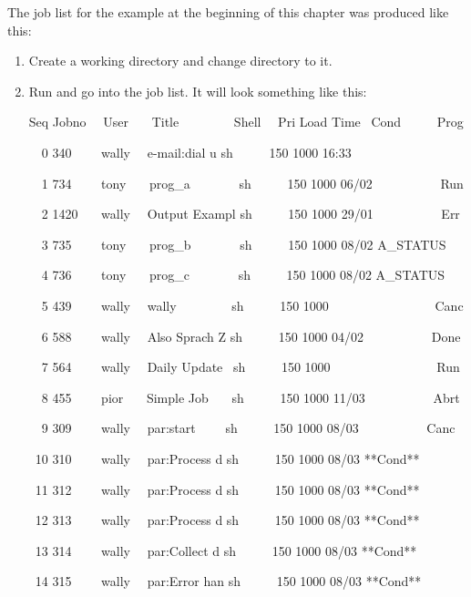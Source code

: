 The job list for the example at the beginning of this chapter was
produced like this:

\begin{enumerate}
\item Create a working directory and change directory to it.
\item Run \PrBtq{} and go into the job list. It will
look something like this:

\begin{exparasmall}

Seq Jobno \ \ User \ \ \ Title \ \ \ \ \ \ \ \ Shell \ \ Pri Load Time
\ Cond \ \ \ \ \ Prog

\ \ 0 340 \ \ \ \ wally \ \ e-mail:dial u sh \ \ \ \ \ 150 1000 16:33

\ \ 1 734 \ \ \ \ tony \ \ \ prog\_a \ \ \ \ \ \ \ sh \ \ \ \ \ 150 1000
06/02 \ \ \ \ \ \ \ \ \ \ Run

\ \ 2 1420 \ \ \ wally \ \ Output Exampl sh \ \ \ \ \ 150 1000 29/01
\ \ \ \ \ \ \ \ \ \ Err

\ \ 3 735 \ \ \ \ tony \ \ \ prog\_b \ \ \ \ \ \ \ sh \ \ \ \ \ 150 1000
08/02 A\_STATUS

\ \ 4 736 \ \ \ \ tony \ \ \ prog\_c \ \ \ \ \ \ \ sh \ \ \ \ \ 150 1000
08/02 A\_STATUS

\ \ 5 439 \ \ \ \ wally \ \ wally \ \ \ \ \ \ \ \ sh \ \ \ \ \ 150 1000
\ \ \ \ \ \ \ \ \ \ \ \ \ \ \ \ Canc

\ \ 6 588 \ \ \ \ wally \ \ Also Sprach Z sh \ \ \ \ \ 150 1000 04/02
\ \ \ \ \ \ \ \ \ \ Done

\ \ 7 564 \ \ \ \ wally \ \ Daily Update \ sh \ \ \ \ \ 150 1000
\ \ \ \ \ \ \ \ \ \ \ \ \ \ \ \ Run

\ \ 8 455 \ \ \ \ pior \ \ \ Simple Job \ \ \ sh \ \ \ \ \ 150 1000
11/03 \ \ \ \ \ \ \ \ \ \ Abrt

\ \ 9 309 \ \ \ \ wally \ \ par:start \ \ \ \ sh \ \ \ \ \ 150 1000
08/03 \ \ \ \ \ \ \ \ \ \ Canc

\ 10 310 \ \ \ \ wally \ \ par:Process d sh \ \ \ \ \ 150 1000 08/03
**Cond**

\ 11 312 \ \ \ \ wally \ \ par:Process d sh \ \ \ \ \ 150 1000 08/03
**Cond**

\ 12 313 \ \ \ \ wally \ \ par:Process d sh \ \ \ \ \ 150 1000 08/03
**Cond**

\ 13 314 \ \ \ \ wally \ \ par:Collect d sh \ \ \ \ \ 150 1000 08/03
**Cond**

\ 14 315 \ \ \ \ wally \ \ par:Error han sh \ \ \ \ \ 150 1000 08/03
**Cond**


\end{exparasmall}
\end{enumerate}
